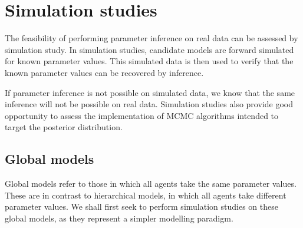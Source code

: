 \graphicspath{{fig/sim_studies/}}

\chapter{Simulation studies}
\label{cha:sim_studies}

The feasibility of performing parameter inference on real data can be assessed by
simulation study. In simulation studies, candidate models are forward simulated for known
parameter values. This simulated data is then used to verify that the known parameter
values can be recovered by inference.

If parameter inference is not possible on simulated data, we know that the same inference
will not be possible on real data. Simulation studies also provide good opportunity to
assess the implementation of MCMC algorithms intended to target the posterior
distribution.

\section{Global models}

Global models refer to those in which all agents take the same parameter values. These are
in contrast to hierarchical models, in which all agents take different parameter values.
We shall first seek to perform simulation studies on these global models, as they
represent a simpler modelling paradigm.  

